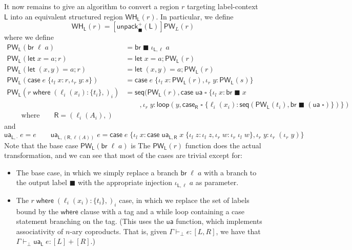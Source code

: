 \documentclass[acmsmall,screen,review]{acmart}
\newcommand{\ms}[1]{\ensuremath{\mathsf{#1}}}
\newcommand{\lto}{:}
\newcommand{\linl}[1]{\iota_l\;{#1}}
\newcommand{\linr}[1]{\iota_r\;{#1}}
\newcommand{\caseexpr}[5]{\ms{case}\;#1\;\{\linl{#2} \lto #3, \linr{#4} \lto #5\}}
\newcommand{\letstmt}[3]{\ensuremath{\ms{let}\;#1 = #2; #3}}
\newcommand{\brb}[2]{\ms{br}\;#1\;#2}
\newcommand{\casestmt}[5]{\ms{case}\;#1\;\{\linl{#2} \lto #3, \linr{#4} \lto #5\}}
\newcommand{\where}[2]{#1\;\ms{where}\;#2}
\newcommand{\wbranch}[3]{#1(#2) \lto \{#3\}}
\newcommand{\hasty}[4]{#1 \vdash_{#2} #3: {#4}}
\newcommand{\towhile}[2]{\ms{WH}_{#1}(#2)}
\newcommand{\topwhile}[2]{\ms{PW}_{#1}(#2)}
\newcommand{\invar}{\square}
\newcommand{\outlb}{\blacksquare}
\begin{document}
It now remains to give an algorithm to convert a region $r$ targeting label-context $\ms{L}$ into an
equivalent structured region $\towhile{\ms{L}}{r}$. In particular, we define
\begin{equation}
  \towhile{\ms{L}}{r} = [\ms{unpack}^+_\outlb(\ms{L})]\topwhile{L}{r}
\end{equation}
where we define
\begin{equation}
  \begin{aligned}
    \topwhile{\ms{L}}{\ms{br}\;\ell\;a} &= \brb{\outlb}{\iota_{\ms{L}, \ell}\;a} \\
    \topwhile{\ms{L}}{\letstmt{x}{a}{r}} &= \letstmt{x}{a}{\topwhile{\ms{L}}{r}} \\
    \topwhile{\ms{L}}{\letstmt{(x, y)}{a}{r}} &= \letstmt{(x, y)}{a}{\topwhile{\ms{L}}{r}} \\
    \topwhile{\ms{L}}{\casestmt{e}{x}{r}{y}{s}} 
      &= \casestmt{e}{x}{\topwhile{\ms{L}}{r}}{y}{\topwhile{\ms{L}}{s}} \\
    \topwhile{\ms{L}}{\where{r}{(\wbranch{\ell_i}{x_i}{t_i},)_i}} 
      &=
      \ms{seq}(\topwhile{\ms{L}}{r}, \caseexpr{\ms{ua}\;\invar}{x}{\brb{\outlb}{x}\\ & \qquad}{y}
        {\ms{loop}(y, 
        \ms{case}_{\ms{R}}\;\invar\;
          \{\ell_i(x_i) : \ms{seq}(\topwhile{\ms{L}}{t_i}, \brb{\outlb}{(\ms{ua}\;\invar)}\})})
      \\ \qquad \text{where} \qquad \ms{R} = (\ell_i(A_i),)
  \end{aligned}
\end{equation}
and
\begin{equation}
  \ms{ua}_{\ms{L}, \cdot}\;e = e \qquad
  \ms{ua}_{\ms{L}, (\ms{R}, \ell(A))}\;e 
    = \caseexpr{e}{x}{
        \caseexpr{\ms{ua}_{\ms{L}, \ms{R}}\;x}{z}{\iota_l\;z}{w}{\iota_r\;\iota_l\;w}}
        {y}{\iota_r\;(\iota_r\;y)}
\end{equation}
Note that the base case $\topwhile{\ms{L}}{\ms{br}\;\ell\;a}$ is
%
The $\topwhile{\ms{L}}{r}$ function does the actual transformation, and we can see that most of the
cases are trivial except for: 
\begin{itemize}
  \item The base case, in which we simply replace a branch $\ms{br}\;\ell\;a$ with a branch to the
  output label $\outlb$ with the appropriate injection $\iota_{\ms{L}, \ell}\;a$ as parameter.
  \item The $\where{r}{(\wbranch{\ell_i}{x_i}{t_i},)_i}$ case, in which we replace the set of labels
  bound by the $\ms{where}$ clause with a tag and a while loop containing a case statement branching
  on the tag. (This uses the $\ms{ua}$ function, which implements associativity of $n$-ary
  coproducts. That is, given $\hasty{\Gamma}{\bot}{e}{[L, R]}$, we have that
  $\hasty{\Gamma}{\bot}{\ms{ua}_{\ms{L}}\;e}{[L] + [R]}$.)
\end{itemize}
\end{document}
